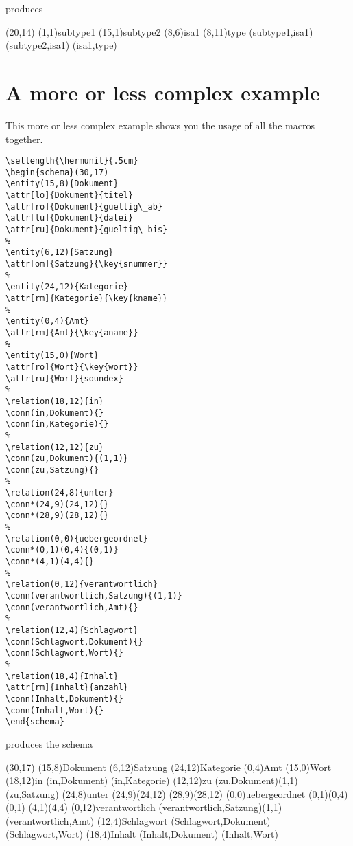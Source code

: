 \documentclass[a4paper,11pt]{article}
\begin{document}
produces

\begin{schema}(20,14)
  \entity(1,1){subtype1}
  \entity(15,1){subtype2}
  \isa(8,6){isa1}
  \entity(8,11){type}
  \conn(subtype1,isa1){}
  \conn(subtype2,isa1){}
  \conn(isa1,type){}
\end{schema}


\section{A more or less complex example}

This more or less complex example shows you the usage of all the macros together.

\begin{verbatim}
\setlength{\hermunit}{.5cm}
\begin{schema}(30,17)
\entity(15,8){Dokument}
\attr[lo]{Dokument}{titel}
\attr[ro]{Dokument}{gueltig\_ab}
\attr[lu]{Dokument}{datei}
\attr[ru]{Dokument}{gueltig\_bis}
%
\entity(6,12){Satzung}
\attr[om]{Satzung}{\key{snummer}}
%
\entity(24,12){Kategorie}
\attr[rm]{Kategorie}{\key{kname}}
%
\entity(0,4){Amt}
\attr[rm]{Amt}{\key{aname}}
%
\entity(15,0){Wort}
\attr[ro]{Wort}{\key{wort}}
\attr[ru]{Wort}{soundex}
%
\relation(18,12){in}
\conn(in,Dokument){}
\conn(in,Kategorie){}
%
\relation(12,12){zu}
\conn(zu,Dokument){(1,1)}
\conn(zu,Satzung){}
%
\relation(24,8){unter}
\conn*(24,9)(24,12){}
\conn*(28,9)(28,12){}
%
\relation(0,0){uebergeordnet}
\conn*(0,1)(0,4){(0,1)}
\conn*(4,1)(4,4){}
%
\relation(0,12){verantwortlich}
\conn(verantwortlich,Satzung){(1,1)}
\conn(verantwortlich,Amt){}
%
\relation(12,4){Schlagwort}
\conn(Schlagwort,Dokument){}
\conn(Schlagwort,Wort){}
%
\relation(18,4){Inhalt}
\attr[rm]{Inhalt}{anzahl}
\conn(Inhalt,Dokument){}
\conn(Inhalt,Wort){}
\end{schema}
\end{verbatim}

produces the schema

\setlength{\hermunit}{.5cm}
\begin{schema}(30,17)
\entity(15,8){Dokument}
%
\entity(6,12){Satzung}
%
\entity(24,12){Kategorie}
%
\entity(0,4){Amt}
%
\entity(15,0){Wort}
%
\relation(18,12){in}
\conn(in,Dokument){}
\conn(in,Kategorie){}
%
\relation(12,12){zu}
\conn(zu,Dokument){(1,1)}
\conn(zu,Satzung){}
%
\relation(24,8){unter}
\conn*(24,9)(24,12){}
\conn*(28,9)(28,12){}
%
\relation(0,0){uebergeordnet}
\conn*(0,1)(0,4){(0,1)}
\conn*(4,1)(4,4){}
%
\relation(0,12){verantwortlich}
\conn(verantwortlich,Satzung){(1,1)}
\conn(verantwortlich,Amt){}
%
\relation(12,4){Schlagwort}
\conn(Schlagwort,Dokument){}
\conn(Schlagwort,Wort){}
%
\relation(18,4){Inhalt}
\conn(Inhalt,Dokument){}
\conn(Inhalt,Wort){}
\end{schema}
\end{document}
